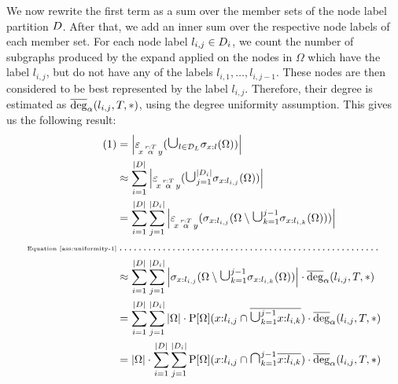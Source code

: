 We now rewrite the first term as a sum over the member sets of the node label
partition $D$. After that, we add an inner sum over the
respective node labels of each member set.
For each node label $l_{i,j} \in D_i$, we count the
number of subgraphs produced by the expand applied on the nodes in $\Omega$
which have the label $l_{i,j}$, but do not have any of the labels
$l_{i,1}, \ldots, l_{i, j-1}$.
These nodes are then considered to be best represented by the label $l_{i,j}$.
Therefore, their degree is estimated as $\avgdeg_\alpha(l_{i,j}, T, *)$, using
the degree uniformity assumption. This gives us the following result:
\begin{align}
\begin{split}
  \text{(1)} &= \card{\expandvar{x}{r:T}{\alpha}{y}(\bigunion_{l \in \nlabels} \selection{x:l}(\Omega))} \\
             &\approx \sum_{i=1}^\card{\lpart}
                  \card{\expandvar{x}{r:T}{\alpha}{y}(\bigunion_{j=1}^\card{\lpart_i}
                  \selection{x:l_{i,j}}(\Omega))} \\
             &= \sum_{i=1}^\card{\lpart}
                \sum_{j=1}^\card{\lpart_i}
                  \card{\expandvar{x}{r:T}{\alpha}{y}(\selection{x:l_{i,j}}(
                  \Omega \setminus \bigunion_{k=1}^{j-1} \selection{x:l_{i,k}}(\Omega)
                  ))} \\
            \text{\tiny Equation \ref{ass:uniformity-1}} &\omit\dotfill \\
             &\approx \sum_{i=1}^\card{\lpart}
                      \sum_{j=1}^\card{\lpart_i}
                        \card{\selection{x:l_{i,j}}(
                        \Omega \setminus \bigunion_{k=1}^{j-1} \selection{x:l_{i,k}}(\Omega)
                        )}
                        \cdot \avgdeg_\alpha(l_{i,j}, T, *) \\
             &= \sum_{i=1}^\card{\lpart}
                \sum_{j=1}^\card{\lpart_i}
                  \card{\Omega}
                  \cdot \prob{\Omega}(x{:}l_{i,j} \isect \overline{\bigunion_{k=1}^{j-1} x{:}l_{i,k}})
                  \cdot \avgdeg_\alpha(l_{i,j}, T, *) \\
             &= \card{\Omega}
                \cdot
                \sum_{i=1}^\card{\lpart}
                \sum_{j=1}^\card{\lpart_i}
                  \prob{\Omega}(x{:}l_{i,j} \isect \bigisect_{k=1}^{j-1} \overline{x{:}l_{i,k}})
                  \cdot \avgdeg_\alpha(l_{i,j}, T, *)
\end{split}
\end{align}


